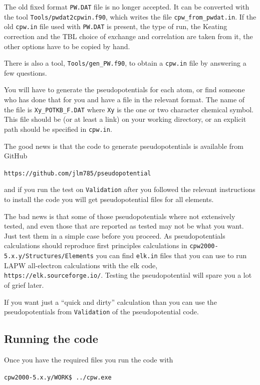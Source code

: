 \documentclass[11pt]{article}
\begin{document}
The old fixed format \texttt{PW.DAT} file is no longer accepted.  It can be converted
with the tool \texttt{Tools/pwdat2cpwin.f90}, which writes the file \texttt{cpw\_from\_pwdat.in}.
If the old \texttt{cpw.in} file used with \texttt{PW.DAT} is present, the type of run, the Keating
correction and the TBL choice of exchange and correlation are taken from it, the other options
have to be copied by hand.

There is also a tool, \texttt{Tools/gen{\_}PW.f90},  to obtain a \texttt{cpw.in} file by answering a few questions.


You will have to generate the pseudopotentials for each atom, or find someone who has done that
for you and have a file in the relevant format.  The name of the file is \texttt{Xy{\_}POTKB{\_}F.DAT} where
\texttt{Xy} is the one or two character chemical symbol.  This file should be (or at least a link) on
your working directory, or an explicit path should be specified in \texttt{cpw.in}.

The good news is that the code to generate pseudopotentials is available from GitHub

\noindent\texttt{https://github.com/jlm785/pseudopotential}

and if you run the test on \texttt{Validation} after you followed the relevant instructions
to install the code you will get pseudopotential files for all elements.

The bad news is that some of those pseudopotentials where not extensively tested, and even those
that are reported as tested may not be what you want.  Just test them in a simple case
before you proceed.  As pseudopotentials calculations should reproduce first principles
calculations in \texttt{cpw2000-5.x.y/Structures/Elements} you can find
\texttt{elk.in} files that you can use to run LAPW all-electron calculations with the {\sc elk} code,
\texttt{https://elk.sourceforge.io/}.  Testing the pseudopotential will spare you a lot of grief
later.

If you want just a ``quick and dirty'' calculation than you can use the pseudopotentials
from \texttt{Validation} of the pseudopotential code.


\subsection{Running the code}
\label{sec:run-code}

Once you have the required files you run the code with

\noindent\texttt{cpw2000-5.x.y/WORK\$ ../cpw.exe}
\end{document}
